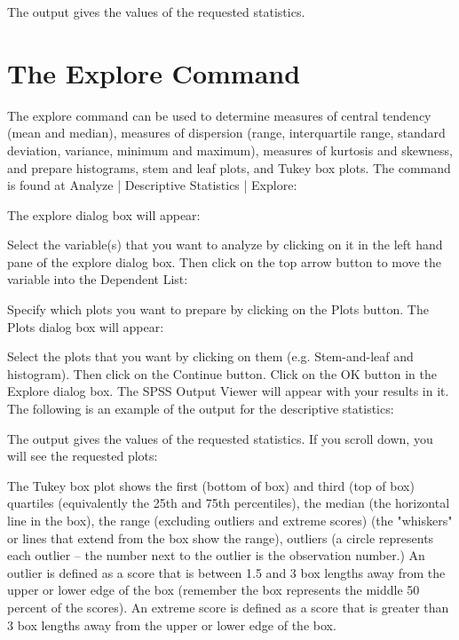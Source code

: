 The output gives the values of the requested statistics.

\section{The Explore Command}

The explore command can be used to determine measures of central tendency (mean and median), measures of dispersion (range, interquartile range, standard deviation, variance, minimum and maximum), measures of kurtosis and skewness, and prepare histograms, stem and leaf plots, and Tukey box plots. The command is found at Analyze | Descriptive Statistics | Explore:

The explore dialog box will appear:

Select the variable(s) that you want to analyze by clicking on it in the left hand pane of the explore dialog box. Then click on the top arrow button to move the variable into the Dependent List:

Specify which plots you want to prepare by clicking on the Plots button. The Plots dialog box will appear:

Select the plots that you want by clicking on them (e.g. Stem-and-leaf and histogram). Then click on the Continue button. Click on the OK button in the Explore dialog box. The SPSS Output Viewer will appear with your results in it. The following is an example of the output for the descriptive statistics:

The output gives the values of the requested statistics. If you scroll down, you will see the requested plots:




	The Tukey box plot shows the first (bottom of box) and third (top of box) quartiles (equivalently the 25th and 75th percentiles), the median (the horizontal line in the box), the range (excluding outliers and extreme scores) (the "whiskers" or lines that extend from the box show the range), outliers (a circle represents each outlier -- the number next to the outlier is the observation number.) An outlier is defined as a score that is between 1.5 and 3 box lengths away from the upper or lower edge of the box (remember the box represents the middle 50 percent of the scores). An extreme score is defined as a score that is greater than 3 box lengths away from the upper or lower edge of the box.
